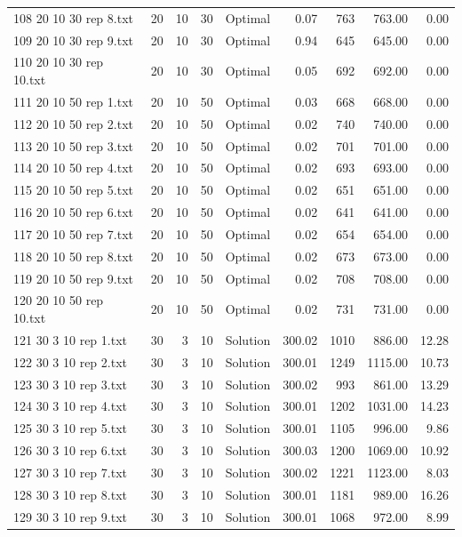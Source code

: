 \begin{longtable}{lrrllrrrr}
108 20 10 30 rep 8.txt & 20 & 10 & 30 & Optimal &  0.07 & 763 & 763.00 &  0.00\\
109 20 10 30 rep 9.txt & 20 & 10 & 30 & Optimal &  0.94 & 645 & 645.00 &  0.00\\
110 20 10 30 rep 10.txt & 20 & 10 & 30 & Optimal &  0.05 & 692 & 692.00 &  0.00\\
111 20 10 50 rep 1.txt & 20 & 10 & 50 & Optimal &  0.03 & 668 & 668.00 &  0.00\\
112 20 10 50 rep 2.txt & 20 & 10 & 50 & Optimal &  0.02 & 740 & 740.00 &  0.00\\
113 20 10 50 rep 3.txt & 20 & 10 & 50 & Optimal &  0.02 & 701 & 701.00 &  0.00\\
114 20 10 50 rep 4.txt & 20 & 10 & 50 & Optimal &  0.02 & 693 & 693.00 &  0.00\\
115 20 10 50 rep 5.txt & 20 & 10 & 50 & Optimal &  0.02 & 651 & 651.00 &  0.00\\
116 20 10 50 rep 6.txt & 20 & 10 & 50 & Optimal &  0.02 & 641 & 641.00 &  0.00\\
117 20 10 50 rep 7.txt & 20 & 10 & 50 & Optimal &  0.02 & 654 & 654.00 &  0.00\\
118 20 10 50 rep 8.txt & 20 & 10 & 50 & Optimal &  0.02 & 673 & 673.00 &  0.00\\
119 20 10 50 rep 9.txt & 20 & 10 & 50 & Optimal &  0.02 & 708 & 708.00 &  0.00\\
120 20 10 50 rep 10.txt & 20 & 10 & 50 & Optimal &  0.02 & 731 & 731.00 &  0.00\\
121 30 3 10 rep 1.txt & 30 & 3 & 10 & Solution & 300.02 & 1010 & 886.00 & 12.28\\
122 30 3 10 rep 2.txt & 30 & 3 & 10 & Solution & 300.01 & 1249 & 1115.00 & 10.73\\
123 30 3 10 rep 3.txt & 30 & 3 & 10 & Solution & 300.02 & 993 & 861.00 & 13.29\\
124 30 3 10 rep 4.txt & 30 & 3 & 10 & Solution & 300.01 & 1202 & 1031.00 & 14.23\\
125 30 3 10 rep 5.txt & 30 & 3 & 10 & Solution & 300.01 & 1105 & 996.00 &  9.86\\
126 30 3 10 rep 6.txt & 30 & 3 & 10 & Solution & 300.03 & 1200 & 1069.00 & 10.92\\
127 30 3 10 rep 7.txt & 30 & 3 & 10 & Solution & 300.02 & 1221 & 1123.00 &  8.03\\
128 30 3 10 rep 8.txt & 30 & 3 & 10 & Solution & 300.01 & 1181 & 989.00 & 16.26\\
129 30 3 10 rep 9.txt & 30 & 3 & 10 & Solution & 300.01 & 1068 & 972.00 &  8.99\\

\end{longtable}
